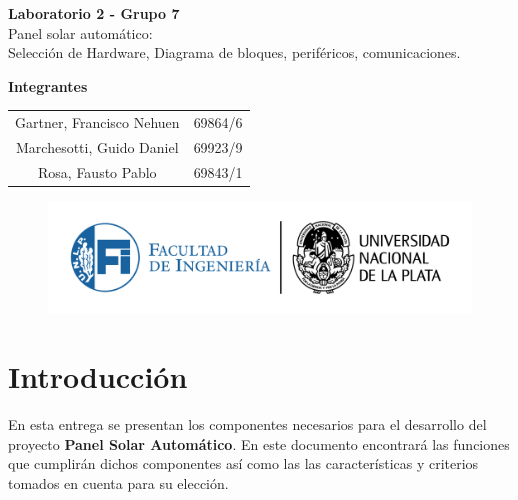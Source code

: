 \documentclass[a4paper,12pt]{article}
\begin{document}
\begin{titlepage}
    \begin{center}
        \vspace*{3cm}
        
        {\Huge \textbf{Laboratorio 2 - Grupo 7}}\\[1cm]
        {\LARGE Panel solar automático:\\ [0.5cm]  Selección de Hardware, Diagrama de bloques, periféricos, comunicaciones.}\\[2cm]
        
        \vfill
        
        {\Large \textbf{Integrantes }}\\[.5cm]
        \large
        \begin{tabular}{c c}
            Gartner, Francisco Nehuen & 69864/6 \\
            Marchesotti, Guido Daniel & 69923/9 \\
            Rosa, Fausto Pablo & 69843/1 \\
        \end{tabular}
        
        \vspace{1cm}
        
        \begin{figure}[b]
            \centering
            \includegraphics[width=1\linewidth]{LOGOSFI-UNLP-color-01.png}
        \end{figure}
        
    \end{center}
\end{titlepage}


\section{Introducción}
En esta entrega se presentan los componentes necesarios para el desarrollo del proyecto \textbf{Panel Solar Automático}. En este documento encontrará las funciones que cumplirán dichos componentes así como las las características y criterios tomados en cuenta para su elección.
\end{document}
